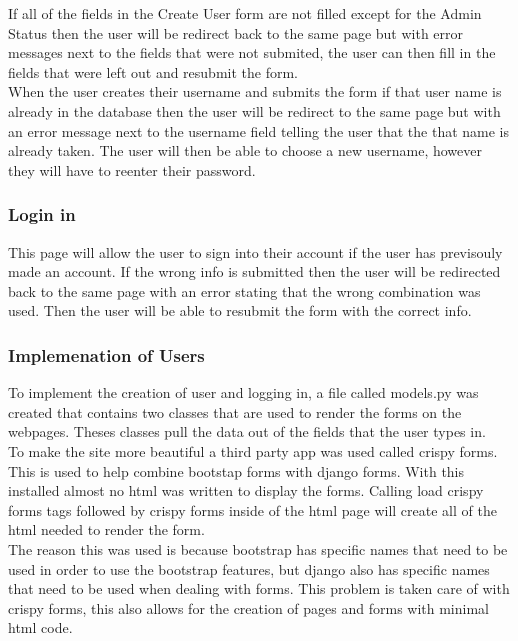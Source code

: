 \documentclass[12pt]{report}
\begin{document}
If all of the fields in the Create User form are not filled except for the Admin Status then the user will be redirect back to the same page but with error messages next to the fields that were not submited, the user can then fill in the fields that were left out and resubmit the form.
\\

When the user creates their username and submits the form if that user name is already in the database then the user will be redirect to the same page but with an error message next to the username field telling the user that the that name is already taken. The user will then be able to choose a new username, however they will have to reenter their password.

\subsubsection*{Login in}
This page will allow the user to sign into their account if the user has previsouly made an account. If the wrong info is submitted then the user will be redirected back to the same page with an error stating that the wrong combination was used. Then the user will be able to resubmit the form with the correct info.

\subsubsection*{Implemenation of Users}
To implement the creation of user and logging in, a file called models.py was created that contains two classes that are used to render the forms on the webpages. Theses classes pull the data out of the fields that the user types in.
\\

To make the site more beautiful a third party app was used called crispy forms. This is used to help combine bootstap forms with django forms. 
With this installed almost no html was written to display the forms. 
Calling load crispy forms tags followed by crispy forms inside of the html page will create all of the html needed to render the form. 
\\

The reason this was used is because bootstrap has specific names that need to be used in order to use the bootstrap features, 
but django also has specific names that need to be used when dealing with forms. 
This problem is taken care of with crispy forms, this also allows for the creation of pages and forms with minimal html code. 
\\
\end{document}
